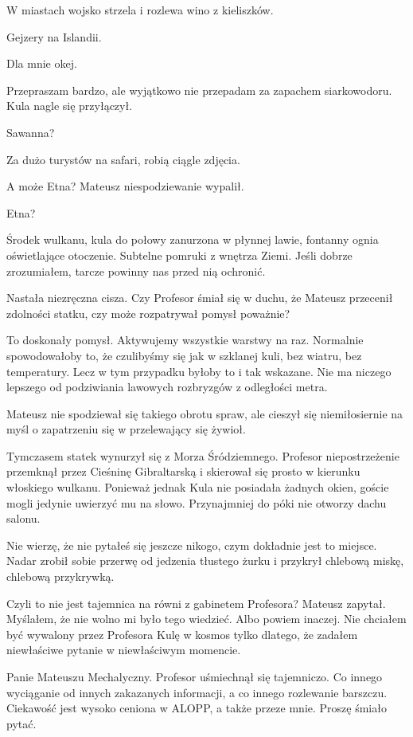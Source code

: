 \ds{} W miastach wojsko strzela i rozlewa wino z kieliszków. \de{}

\ds{} Gejzery na Islandii. \de{}

\ds{} Dla mnie okej. \de{}

\ds{} Przepraszam bardzo, ale wyjątkowo nie przepadam za zapachem siarkowodoru. \dm{} Kula nagle się przyłączył. \de{}

\ds{} Sawanna? \de{}

\ds{} Za dużo turystów na safari, robią ciągle zdjęcia. \de{}

\ds{} A może Etna? \dm{} Mateusz niespodziewanie wypalił. \de{}

\ds{} Etna? \de{}

\ds{} Środek wulkanu, kula do połowy zanurzona w płynnej lawie, fontanny ognia oświetlające otoczenie. Subtelne pomruki z wnętrza Ziemi.
Jeśli dobrze zrozumiałem, tarcze powinny nas przed nią ochronić. \de{}

Nastała niezręczna cisza. Czy Profesor śmiał się w duchu, że Mateusz przecenił zdolności statku, czy może rozpatrywał pomysł poważnie?

\ds{} To doskonały pomysł. Aktywujemy wszystkie warstwy na raz. Normalnie spowodowałoby to, że czulibyśmy się 
jak w szklanej kuli, bez wiatru, bez temperatury. Lecz w tym przypadku byłoby to i tak wskazane.
Nie ma niczego lepszego od podziwiania lawowych rozbryzgów z odległości metra. \de{}

Mateusz nie spodziewał się takiego obrotu spraw, ale cieszył się niemiłosiernie na myśl o zapatrzeniu się w przelewający się żywioł.

Tymczasem statek wynurzył się z Morza Śródziemnego. Profesor niepostrzeżenie przemknął przez Cieśninę Gibraltarską i skierował się prosto w kierunku włoskiego wulkanu.
Ponieważ jednak Kula nie posiadała żadnych okien, goście mogli jedynie uwierzyć mu na słowo. Przynajmniej do póki nie otworzy dachu salonu.

\ds{} Nie wierzę, że nie pytałeś się jeszcze nikogo, czym dokładnie jest to miejsce. \dm{} Nadar zrobił sobie przerwę od jedzenia 
tłustego żurku i przykrył chlebową miskę, chlebową przykrywką. \de{}

\ds{} Czyli to nie jest tajemnica na równi z gabinetem Profesora? \dm{} Mateusz zapytał. \dm{} Myślałem, że nie wolno mi było tego wiedzieć.
Albo powiem inaczej. Nie chciałem być wywalony przez Profesora Kulę w kosmos tylko dlatego, że zadałem niewłaściwe pytanie w niewłaściwym momencie. \de{}

\ds{} Panie Mateuszu Mechalyczny. \dm{} Profesor uśmiechnął się tajemniczo. \dm{} Co innego wyciąganie od innych zakazanych informacji, a co innego rozlewanie barszczu. 
Ciekawość jest wysoko ceniona w ALOPP, a także przeze mnie. Proszę śmiało pytać. \de{}

